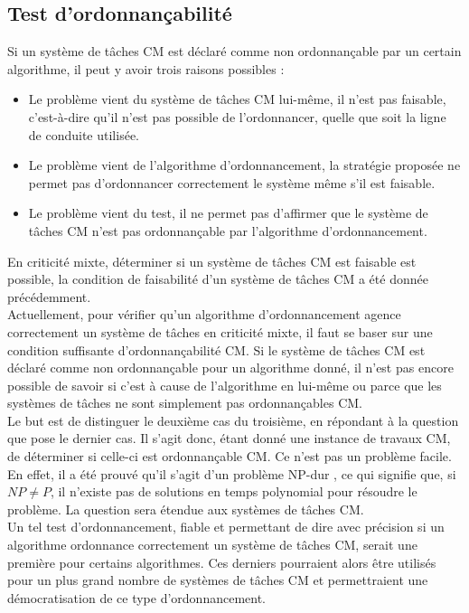 \documentclass[12pt,a4paper,oneside]{book}
\theoremstyle{break}
\theoremstyle{breakplain}
\begin{document}
\subsection{Test d'ordonnançabilité}
Si un système de tâches CM est déclaré comme non ordonnançable par un certain algorithme, il peut y avoir trois raisons possibles \cite{bakerbrute} :
\begin{itemize}
\item Le problème vient du système de tâches CM lui-même, il n'est pas faisable, c'est-à-dire qu'il n'est pas possible de l'ordonnancer, quelle que soit la ligne de conduite utilisée.
\item Le problème vient de l'algorithme d'ordonnancement, la stratégie proposée ne permet pas d'ordonnancer correctement le système même s'il est faisable.
\item Le problème vient du test, il ne permet pas d'affirmer que le système de tâches CM n'est pas ordonnançable par l'algorithme d'ordonnancement.\\
\end{itemize}

En criticité mixte, déterminer si un système de tâches CM est faisable est possible, la condition de faisabilité d'un système de tâches CM a été donnée précédemment.\\
Actuellement, pour vérifier qu'un algorithme d'ordonnancement agence correctement un système de tâches en criticité mixte, il faut se baser sur une condition suffisante d'ordonnançabilité CM. Si le système de tâches CM est déclaré comme non ordonnançable pour un algorithme donné, il n'est pas encore possible de savoir si c'est à cause de l'algorithme en lui-même ou parce que les systèmes de tâches ne sont simplement pas ordonnançables CM.\\

Le but est de distinguer le deuxième cas du troisième, en répondant à la question que pose le dernier cas. Il s'agit donc, étant donné une instance de travaux CM, de déterminer si celle-ci est ordonnançable CM. Ce n'est pas un problème facile.\\En effet, il a été prouvé qu'il s'agit d'un problème NP-dur \cite{baruah2009mixed}, ce qui signifie que, si $NP \neq P$, il n'existe pas de solutions en temps polynomial pour résoudre le problème. La question sera étendue aux systèmes de tâches CM.\\

Un tel test d'ordonnancement, fiable et permettant de dire avec précision si un algorithme ordonnance correctement un système de tâches CM, serait une première pour certains algorithmes. Ces derniers pourraient alors être utilisés pour un plus grand nombre de systèmes de tâches CM et permettraient une démocratisation de ce type d'ordonnancement.\\
\end{document}
